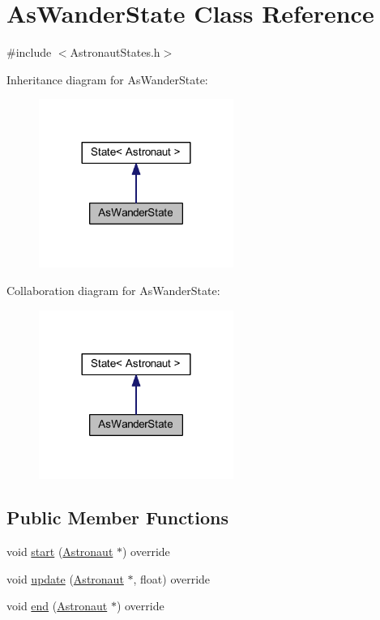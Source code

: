 \hypertarget{class_as_wander_state}{}\section{As\+Wander\+State Class Reference}
\label{class_as_wander_state}


{\ttfamily \#include $<$Astronaut\+States.\+h$>$}



Inheritance diagram for As\+Wander\+State\+:\nopagebreak
\begin{figure}[H]
\begin{center}
\leavevmode
\includegraphics[width=180pt]{class_as_wander_state__inherit__graph}
\end{center}
\end{figure}


Collaboration diagram for As\+Wander\+State\+:\nopagebreak
\begin{figure}[H]
\begin{center}
\leavevmode
\includegraphics[width=180pt]{class_as_wander_state__coll__graph}
\end{center}
\end{figure}
\subsection*{Public Member Functions}
\begin{DoxyCompactItemize}
\item 
void \hyperlink{class_as_wander_state_a7821ce2fdac9afa1b111f695ac51af43}{start} (\hyperlink{class_astronaut}{Astronaut} $\ast$) override
\item 
void \hyperlink{class_as_wander_state_ab95b3dd74d0f3109a4778fceda43221d}{update} (\hyperlink{class_astronaut}{Astronaut} $\ast$, float) override
\item 
void \hyperlink{class_as_wander_state_ab225e3074b252027cfd84f8fe9171e1c}{end} (\hyperlink{class_astronaut}{Astronaut} $\ast$) override
\end{DoxyCompactItemize}
